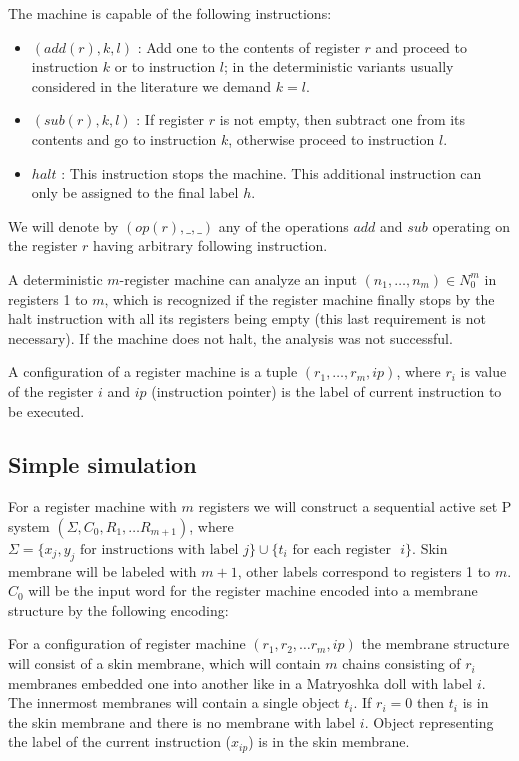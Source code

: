 \documentclass[llncs,submission,copyright,creativecommons]{../lib/lncs/llncs}
\begin{document}
The machine is capable of the following instructions:
\begin{itemize}
  \item $(add(r),k,l)$ : Add one to the contents of register $r$ and proceed to instruction $k$ or to instruction $l$; in the deterministic variants usually considered in the literature we demand $k = l$.
  \item $(sub(r),k,l)$ : If register $r$ is not empty, then subtract one from its contents and go to instruction $k$, otherwise proceed to instruction $l$.
  \item $halt$ : This instruction stops the machine. This additional instruction can only be assigned to the final label $h$.
\end{itemize}

We will denote by $(op(r), \_, \_)$ any of the operations $add$ and $sub$ operating on the register $r$ having arbitrary following instruction. 

A deterministic $m$-register machine can analyze an input $(n_1,\dots,n_m)\in N_0^m$ in registers 1 to $m$, which is recognized if the register machine finally stops by the halt instruction with all its registers being empty (this last requirement is not necessary). If the machine does not halt, the analysis was not successful.

A configuration of a register machine is a tuple $(r_1, \ldots, r_m, ip)$, where $r_i$ is value of the register $i$ and $ip$ (instruction pointer) is the label of current instruction to be executed.


\subsection{Simple simulation} %
\label{sub:simple_simulation}

For a register machine with $m$ registers we will construct a sequential active set P system $(\Sigma, C_0, R_1, \ldots R_{m+1})$, where $\Sigma = \{x_j, y_j \text{~for instructions with label~} j\}\cup\{t_i \text{~for each register ~}i\}$. Skin membrane will be labeled with $m+1$, other labels correspond to registers 1 to $m$. $C_0$ will be the input word for the register machine encoded into a membrane structure by the following encoding: 

For a configuration of register machine $(r_1, r_2, \ldots r_m, ip)$ the membrane structure will consist of a skin membrane, which will contain $m$ chains consisting of $r_i$ membranes embedded one into another like in a Matryoshka doll with label $i$. The innermost membranes will contain a single object $t_i$. If $r_i = 0$ then $t_i$ is in the skin membrane and there is no membrane with label $i$. Object representing the label of the current instruction ($x_{ip}$) is in the skin membrane.
\end{document}
